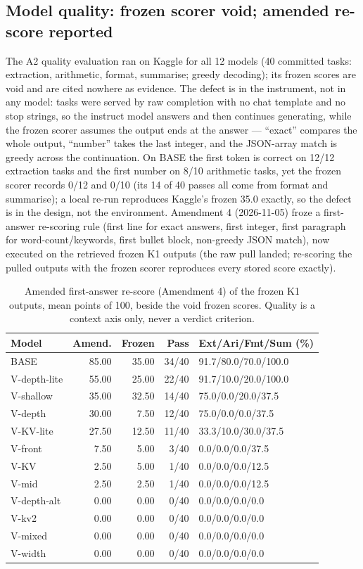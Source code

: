 \documentclass[10pt,letterpaper,twocolumn]{article}
\begin{document}
\subsection{Model quality: frozen scorer void; amended re-score reported}
\label{sec:quality}
The A2 quality evaluation ran on Kaggle for all 12 models (40
committed tasks: extraction, arithmetic, format, summarise; greedy
decoding); its frozen scores are void and are cited nowhere as
evidence. The defect is in the instrument, not in any model: tasks
were served by raw completion with no chat template and no stop
strings, so the instruct model answers and then continues
generating, while the frozen scorer assumes the output ends at
the answer --- ``exact'' compares the whole output, ``number''
takes the last integer, and the JSON-array match is greedy across
the continuation. On BASE the first token is correct on 12/12
extraction tasks and the first number on 8/10 arithmetic tasks,
yet the frozen scorer records 0/12 and 0/10 (its 14 of 40 passes
all come from format and summarise); a local re-run reproduces
Kaggle's frozen 35.0 exactly, so the defect is in the design, not
the environment. Amendment 4 (2026-11-05) froze a first-answer
re-scoring rule (first line for exact answers, first integer,
first paragraph for word-count/keywords, first bullet block,
non-greedy JSON match), now executed on the retrieved frozen K1
outputs (the raw pull landed; re-scoring the pulled outputs with
the frozen scorer reproduces every stored score exactly).
\begin{table}[ht]
\centering\scriptsize\setlength{\tabcolsep}{3pt}
\begin{tabular}{@{}lrrrl@{}}
\toprule
Model & Amend. & Frozen & Pass & Ext/Ari/Fmt/Sum (\%) \\
\midrule
BASE & 85.00 & 35.00 & 34/40 & 91.7/80.0/70.0/100.0 \\
V-depth-lite & 55.00 & 25.00 & 22/40 & 91.7/10.0/20.0/100.0 \\
V-shallow & 35.00 & 32.50 & 14/40 & 75.0/0.0/20.0/37.5 \\
V-depth & 30.00 & 7.50 & 12/40 & 75.0/0.0/0.0/37.5 \\
V-KV-lite & 27.50 & 12.50 & 11/40 & 33.3/10.0/30.0/37.5 \\
V-front & 7.50 & 5.00 & 3/40 & 0.0/0.0/0.0/37.5 \\
V-KV & 2.50 & 5.00 & 1/40 & 0.0/0.0/0.0/12.5 \\
V-mid & 2.50 & 2.50 & 1/40 & 0.0/0.0/0.0/12.5 \\
V-depth-alt & 0.00 & 0.00 & 0/40 & 0.0/0.0/0.0/0.0 \\
V-kv2 & 0.00 & 0.00 & 0/40 & 0.0/0.0/0.0/0.0 \\
V-mixed & 0.00 & 0.00 & 0/40 & 0.0/0.0/0.0/0.0 \\
V-width & 0.00 & 0.00 & 0/40 & 0.0/0.0/0.0/0.0 \\
\bottomrule
\end{tabular}
\caption{Amended first-answer re-score (Amendment 4) of the
frozen K1 outputs, mean points of 100, beside the void frozen
scores. Quality is a context axis only, never a verdict
criterion.}
\end{table}
\end{document}
